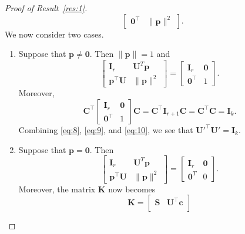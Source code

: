 \documentclass[11pt,a4paper]{article}
\theoremstyle{mybreak}
\numberwithin{dummy}{section}
\theoremstyle{plain}
\theoremstyle{plain}
\theoremstyle{plain}
\theoremstyle{plain}
\theoremstyle{MyNonumberplain}
\newtheorem{proof}{Proof}
\newcommand{\0}{\M{0}}
\newcommand{\M}[1]{\mathbf{#1}}
\newcommand{\T}{\top}
\newcommand{\ve}[1]{\mathbf{#1}}
\begin{document}
\begin{proof}[Proof of Result~\ref{res:1}]
\begin{displaymath}
\begin{bmatrix}
      \0^\T& \| \ve{p} \|^2
    \end{bmatrix}.
  \end{displaymath}
  We now consider two cases.
  \begin{enumerate}[font=\upshape,label=(\roman*),wide,align=right]
    \item Suppose that $\ve{p} \neq \0$. Then $\| \ve{p} \| = 1$ and
    \begin{equation}
      \label{eq:9}
      \begin{bmatrix}
        \M{I}_r & \M{U}^T \ve{p}
        \\
        \ve{p}^\T \M{U} & \| \ve{p} \|^2
      \end{bmatrix}
      =
      \begin{bmatrix}
        \M{I}_r & \0 \\
        \0^\T& 1
      \end{bmatrix}.
    \end{equation}
    Moreover,
    \begin{equation}
      \label{eq:10}
      \M{C}^\T
      \begin{bmatrix}
        \M{I}_r & \0 \\
        \0^\T& 1
      \end{bmatrix}
      \M{C}
      =
      \M{C}^\T \M{I}_{r+1} \M{C}
      =
      \M{C}^\T \M{C}
      = \M{I}_k.
    \end{equation}
    Combining \eqref{eq:8}, \eqref{eq:9}, and \eqref{eq:10}, we see that
    \begin{math}
      \M{U}'^\T \M{U'} = \M{I}_k.
    \end{math}
  \item Suppose that $\ve{p} = \0$. Then
    \begin{equation}
      \label{eq:11}
      \begin{bmatrix}
        \M{I}_r & \M{U}^T \ve{p} \\
        \ve{p}^\T \M{U} & \| \ve{p} \|^2
      \end{bmatrix}
      =
      \begin{bmatrix}
        \M{I}_r & \0 \\
        \0^T & 0
      \end{bmatrix}.
    \end{equation}
    Moreover, the matrix $\M{K}$ now becomes
    \begin{displaymath}
      \M{K} =
      \begin{bmatrix}
        \M{S} & \M{U}^\T \ve{c} \\

\end{bmatrix}
\end{displaymath}
\end{enumerate}
\end{proof}
\end{document}
